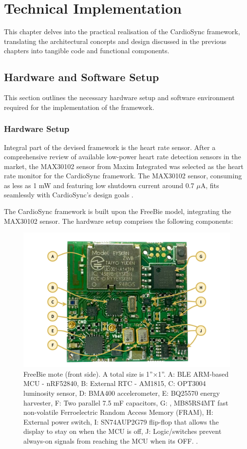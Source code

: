\chapter{Technical Implementation}
\label{chap:implementation}
This chapter delves into the practical realisation of the CardioSync framework, translating the architectural concepts and design discussed in the previous chapters into tangible code and functional components. 

\section{Hardware and Software Setup}
This section outlines the necessary hardware setup and software environment required for the implementation of the framework.

\subsection{Hardware Setup}

\noindent Integral part of the devised framework is the heart rate sensor. After a comprehensive review of available low-power heart rate detection sensors in the market, the MAX30102 sensor from Maxim Integrated \cite{2018MAX30102} was selected as the heart rate monitor for the CardioSync framework. The MAX30102 sensor, consuming as less as 1 mW and featuring low shutdown current around 0.7 \(\mu\)A, fits seamlessly with CardioSync's design goals \cite{2018MAX30102}.
\vspace{1\baselineskip}

\noindent The CardioSync framework is built upon the FreeBie model, integrating the MAX30102 sensor. The hardware setup comprises the following components:

\begin{figure}[t]
    \centering
    \includegraphics[width=0.6\linewidth]{chapters/Implementation/FreeBie.png}
    \caption{FreeBie mote (front side). A total size is 1”×1”. A: BLE ARM-based MCU - nRF52840, B: External RTC - AM1815, C: OPT3004 luminosity sensor, D: BMA400 accelerometer, E: BQ25570 energy harvester, F: Two parallel 7.5 mF capacitors, G: , MB85RS4MT fast non-volatile Ferroelectric Random Access Memory (FRAM), H: External power switch, I: SN74AUP2G79 flip-flop that allows the display to stay on when the MCU is off, J: Logic/switches prevent always-on signals from reaching the MCU when its OFF. \cite{de2022Intermittently}.}
    \label{fig:freebie}
\end{figure}

